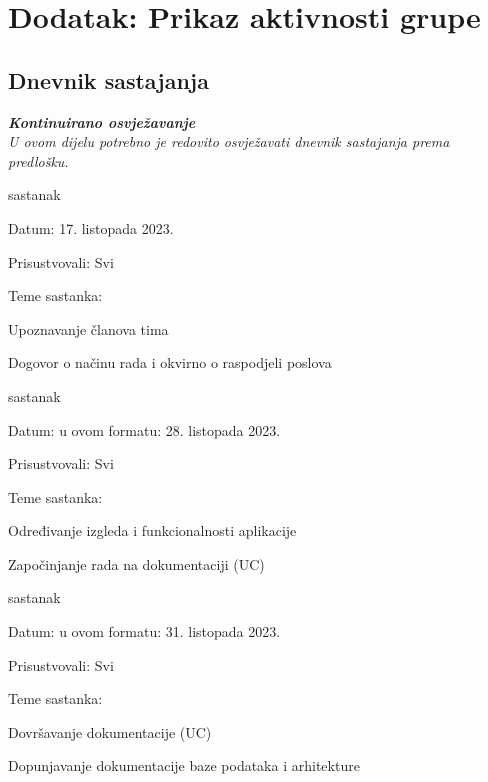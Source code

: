 \chapter*{Dodatak: Prikaz aktivnosti grupe}
		
		\section*{Dnevnik sastajanja}
		
		\textbf{\textit{Kontinuirano osvježavanje}}\\
		
		 \textit{U ovom dijelu potrebno je redovito osvježavati dnevnik sastajanja prema predlošku.}
		
		\begin{packed_enum}
			\item  sastanak
			
			\item[] \begin{packed_item}
				\item Datum: 17. listopada 2023.
				\item Prisustvovali: Svi
				\item Teme sastanka:
				\begin{packed_item}
					\item  Upoznavanje članova tima
					\item  Dogovor o načinu rada i okvirno o raspodjeli poslova
				\end{packed_item}
			\end{packed_item}
			
			\item  sastanak
			\item[] \begin{packed_item}
				\item Datum: u ovom formatu: 28. listopada 2023.
				\item Prisustvovali: Svi
				\item Teme sastanka:
				\begin{packed_item}
					\item  Određivanje izgleda i funkcionalnosti aplikacije
					\item  Započinjanje rada na dokumentaciji (UC)
				\end{packed_item}
			\end{packed_item}

			\item  sastanak
			\item[] \begin{packed_item}
				\item Datum: u ovom formatu: 31. listopada 2023.
				\item Prisustvovali: Svi
				\item Teme sastanka:
				\begin{packed_item}
					\item  Dovršavanje dokumentacije (UC)
					\item  Dopunjavanje dokumentacije baze podataka i arhitekture
				\end{packed_item}
			\end{packed_item}
			

\end{packed_enum}

